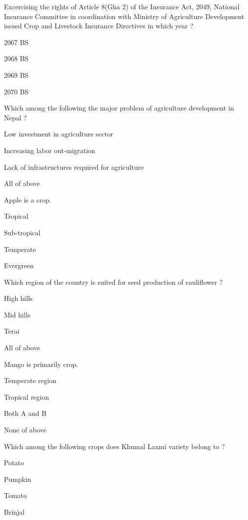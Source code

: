 \begin{questions}
\question Excercising the rights of Article 8(Gha 2) of the Insurance Act, 2049, National Insurance Committee in coordination with Ministry of Agriculture Development issued Crop and Livestock Insurance Directives in which year ?
  \begin{items}
  \item 2067 BS
  \item 2068 BS
  \item 2069 BS
  \item* 2070 BS
  \end{items}

\question Which among the following the major problem of agriculture development in Nepal ?
  \begin{items}
  \item Low investment in agriculture sector
  \item Increasing labor out-migration
  \item Lack of infrastructures required for agriculture
  \item* All of above
  \end{items}

\question Apple is a \fillin[][3cm] crop.
  \begin{items}
  \item Tropical
  \item Sub-tropical
  \item* Temperate
  \item Evergreen
  \end{items}

\question Which region of the country is suited for seed production of cauliflower ?
  \begin{items}
  \item* High hills
  \item Mid hills
  \item Terai
  \item All of above
  \end{items}

\question Mango is primarily \fillin[][3cm] crop.
  \begin{items}
  \item Temperate region
  \item* Tropical region
  \item Both A and B
  \item None of above
  \end{items}

\question Which among the following crops does Khumal Laxmi variety belong to ?
  \begin{items}
  \item* Potato
  \item Pumpkin
  \item Tomato
  \item Brinjal
  \end{items}


\end{questions}
